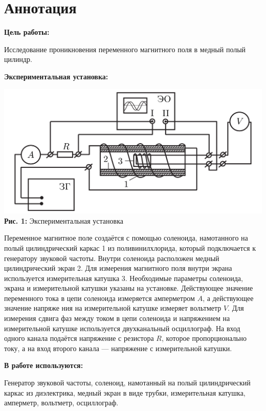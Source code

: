 \documentclass[12pt,a4paper]{scrartcl}
\begin{document}
	\section{Аннотация}
	
	\textbf{Цель работы: }
	
	Исследование проникновения переменного магнитного поля в медный полый цилиндр.
		
	\textbf{Экспериментальная установка:}
		
	\begin{center}
		\includegraphics[scale=0.25]{PIC_1.png}
		\\\textbf{Рис. 1:} Экспериментальная установка
	\end{center}	

	Переменное магнитное поле создаётся с помощью соленоида, намотанного на полый цилиндрический каркас 1 из поливинилхлорида, который подключается к генератору звуковой частоты. Внутри соленоида расположен медный цилиндрический экран 2. Для измерения магнитного поля внутри экрана используется измерительная катушка 3.
	Необходимые параметры соленоида, экрана и измерительной катушки указаны на установке. Действующее значение переменного тока в цепи соленоида измеряется амперметром $A$, а действующее значение напряже	ния на измерительной катушке измеряет вольтметр $V$. Для измерения сдвига фаз между током в цепи соленоида и напряжением на измерительной катушке используется двухканальный осциллограф. На вход одного
	канала подаётся напряжение с резистора $R$, которое пропорционально току, а на вход второго канала — напряжение с измерительной катушки.
		
	\textbf{В работе используются:}
	
	Генератор звуковой частоты, соленоид, намотанный на полый цилиндрический каркас из диэлектрика, медный экран в виде трубки, измерительная катушка,	амперметр, вольтметр, осциллограф.
	
\end{document}
